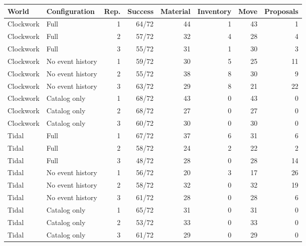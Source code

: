 \begin{tabular*}{\textwidth}{@{\extracolsep{\fill}}llrrrrrr@{}}
\toprule
World & Configuration & Rep. & Success & Material & Inventory & Move & Proposals \\
\midrule
Clockwork & Full & 1 & 64/72 & 44 & 1 & 43 & 1 \\
Clockwork & Full & 2 & 57/72 & 32 & 4 & 28 & 4 \\
Clockwork & Full & 3 & 55/72 & 31 & 1 & 30 & 3 \\
Clockwork & No event history & 1 & 59/72 & 30 & 5 & 25 & 11 \\
Clockwork & No event history & 2 & 55/72 & 38 & 8 & 30 & 9 \\
Clockwork & No event history & 3 & 63/72 & 29 & 8 & 21 & 22 \\
Clockwork & Catalog only & 1 & 68/72 & 43 & 0 & 43 & 0 \\
Clockwork & Catalog only & 2 & 68/72 & 27 & 0 & 27 & 0 \\
Clockwork & Catalog only & 3 & 60/72 & 30 & 0 & 30 & 0 \\
\midrule
Tidal & Full & 1 & 67/72 & 37 & 6 & 31 & 6 \\
Tidal & Full & 2 & 58/72 & 24 & 2 & 22 & 2 \\
Tidal & Full & 3 & 48/72 & 28 & 0 & 28 & 14 \\
Tidal & No event history & 1 & 56/72 & 20 & 3 & 17 & 26 \\
Tidal & No event history & 2 & 58/72 & 32 & 0 & 32 & 19 \\
Tidal & No event history & 3 & 61/72 & 28 & 0 & 28 & 6 \\
Tidal & Catalog only & 1 & 65/72 & 31 & 0 & 31 & 0 \\
Tidal & Catalog only & 2 & 53/72 & 33 & 0 & 33 & 0 \\
Tidal & Catalog only & 3 & 61/72 & 29 & 0 & 29 & 0 \\
\bottomrule
\end{tabular*}

